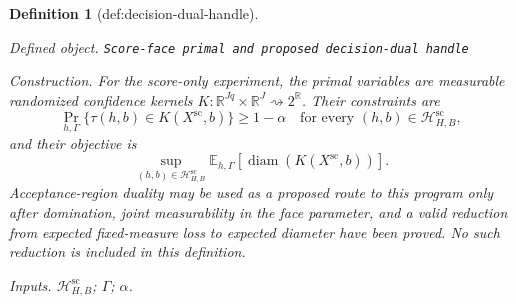 \documentclass{article}
\newtheorem{definition}{Definition}
\begin{document}
\begin{definition}[def:decision-dual-handle]\label{def:decision-dual-handle}
\par\smallskip\noindent\emph{Defined object.} \texttt{Score-\allowbreak{}face primal and proposed decision-\allowbreak{}dual handle}
\par\smallskip\noindent\emph{Construction.} For the score-only experiment, the primal variables are measurable randomized confidence kernels \(K:\mathbb R^{Jq}\times\mathbb R^J\rightsquigarrow2^{\mathbb R}\). Their constraints are
\[
 \Pr_{h,\Gamma}\{\tau(h,b)\in K(X^{\mathrm{sc}},b)\}\geq1-\alpha
 \quad\text{for every }(h,b)\in\mathcal H_{H,B}^{\mathrm{sc}},
\]
and their objective is
\[
 \sup_{(h,b)\in\mathcal H_{H,B}^{\mathrm{sc}}}
 \mathbb E_{h,\Gamma}[\operatorname{diam}(K(X^{\mathrm{sc}},b))].
\]
Acceptance-region duality may be used as a proposed route to this program only after domination, joint measurability in the face parameter, and a valid reduction from expected fixed-measure loss to expected diameter have been proved. No such reduction is included in this definition.
\par\smallskip\noindent\emph{Inputs.} \(\mathcal H_{H,B}^{\mathrm{sc}}\); \(\Gamma\); \(\alpha\).
\end{definition}
\end{document}
